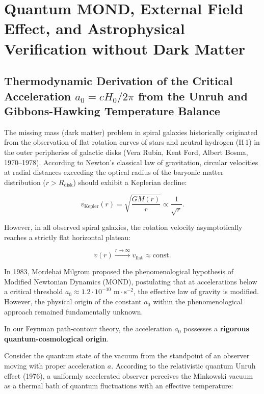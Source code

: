 \documentclass[11pt,a4paper]{article}
\theoremstyle{definition}
\newcommand{\ion}[2]{#1\,\textsc{\lowercase{#2}}}
\begin{document}
\section{Quantum MOND, External Field Effect, and Astrophysical Verification without Dark Matter}\label{sec:rozdil4}

\subsection{Thermodynamic Derivation of the Critical Acceleration $a_0 = c H_0 / 2\pi$ from the Unruh and Gibbons-Hawking Temperature Balance}\label{sec:4.1}

The missing mass (dark matter) problem in spiral galaxies historically originated from the observation of flat rotation curves of stars and neutral hydrogen (\ion{H}{1}) in the outer peripheries of galactic disks (Vera Rubin, Kent Ford, Albert Bosma, 1970--1978). According to Newton's classical law of gravitation, circular velocities at radial distances exceeding the optical radius of the baryonic matter distribution ($r > R_{\text{disk}}$) should exhibit a Keplerian decline:

\begin{equation}\label{eq:4.1}\tag{4.1}
v_{\text{Kepler}}(r) = \sqrt{\frac{G M(r)}{r}} \propto \frac{1}{\sqrt{r}}.
\end{equation}

However, in all observed spiral galaxies, the rotation velocity asymptotically reaches a strictly flat horizontal plateau:

\begin{equation}\label{eq:4.2}\tag{4.2}
v(r) \xrightarrow{r \to \infty} v_{\text{flat}} \approx \text{const}.
\end{equation}

In 1983, Mordehai Milgrom \cite{ref23} proposed the phenomenological hypothesis of Modified Newtonian Dynamics (MOND), postulating that at accelerations below a critical threshold $a_0 \approx 1.2 \cdot 10^{-10}\text{ m}\cdot\text{s}^{-2}$, the effective law of gravity is modified. However, the physical origin of the constant $a_0$ within the phenomenological approach remained fundamentally unknown.

In our Feynman path-contour theory, the acceleration $a_0$ possesses a \textbf{rigorous quantum-cosmological origin}.

Consider the quantum state of the vacuum from the standpoint of an observer moving with proper acceleration $a$. According to the relativistic quantum Unruh effect \cite{ref24} (1976), a uniformly accelerated observer perceives the Minkowski vacuum as a thermal bath of quantum fluctuations with an effective temperature:
\end{document}
